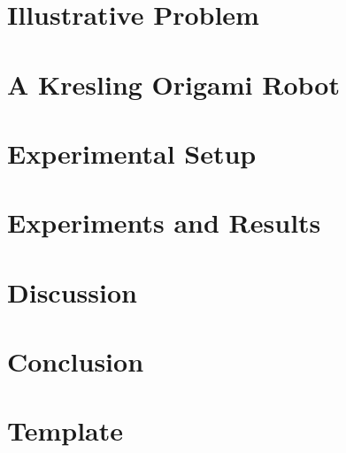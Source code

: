 \documentclass[a4paper, 10pt, twoside]{IEEEtran}
\begin{document}
    \section{Illustrative Problem}\label{sec:toy-problem}
    


    \section{A Kresling Origami Robot}\label{sec:origami-robot}
    


    \section{Experimental Setup}\label{sec:experimental-setup}
    


    \section{Experiments and Results}\label{sec:results}
    


    \section{Discussion}\label{sec:discussion}
    

    \section{Conclusion}\label{sec:conclusion}
    

    \printbibliography
    \FloatBarrier

    \appendices
    \renewcommand{\thefigure}{\Alph{section}.\arabic{figure}}
    \renewcommand{\thetable}{\Alph{section}.\Roman{table}}
    \preto\section{
        \setcounter{figure}{0}
        \setcounter{table}{0}
    }
    

    \onecolumn
    \section*{Template}
    \vspace*{2cm}
    
%        

\end{document}
